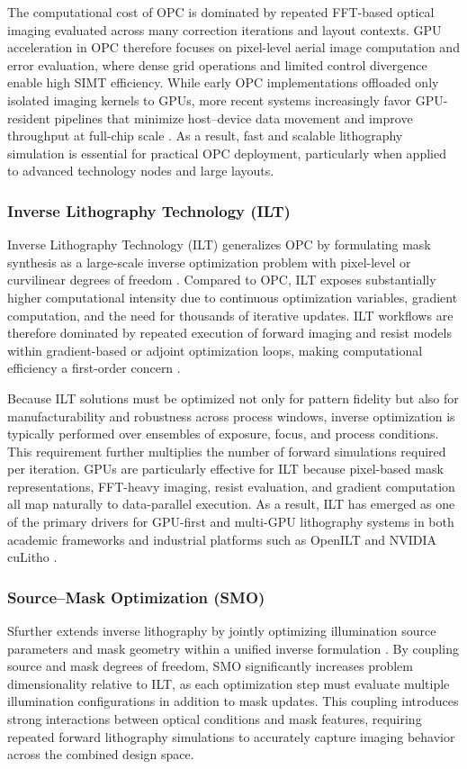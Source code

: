 \documentclass[pdflatex,sn-mathphys-num]{sn-jnl}%
\theoremstyle{thmstyleone}%
\theoremstyle{thmstyletwo}%
\theoremstyle{thmstylethree}%
\begin{document}
The computational cost of OPC is dominated by repeated FFT-based optical imaging evaluated across many correction iterations and layout contexts. GPU acceleration in OPC therefore focuses on pixel-level aerial image computation and error evaluation, where dense grid operations and limited control divergence enable high SIMT efficiency. While early OPC implementations offloaded only isolated imaging kernels to GPUs, more recent systems increasingly favor GPU-resident pipelines that minimize host–device data movement and improve throughput at full-chip scale \cite{Zheng2023}. As a result, fast and scalable lithography simulation is essential for practical OPC deployment, particularly when applied to advanced technology nodes and large layouts.

\subsubsection{Inverse Lithography Technology (ILT)}
Inverse Lithography Technology (ILT) generalizes OPC by formulating mask synthesis as a large-scale inverse optimization problem with pixel-level or curvilinear degrees of freedom \cite{Gallatin2005}. Compared to OPC, ILT exposes substantially higher computational intensity due to continuous optimization variables, gradient computation, and the need for thousands of iterative updates. ILT workflows are therefore dominated by repeated execution of forward imaging and resist models within gradient-based or adjoint optimization loops, making computational efficiency a first-order concern \cite{Gallatin2005,smith2003methods}.

Because ILT solutions must be optimized not only for pattern fidelity but also for manufacturability and robustness across process windows, inverse optimization is typically performed over ensembles of exposure, focus, and process conditions. This requirement further multiplies the number of forward simulations required per iteration. GPUs are particularly effective for ILT because pixel-based mask representations, FFT-heavy imaging, resist evaluation, and gradient computation all map naturally to data-parallel execution. As a result, ILT has emerged as one of the primary drivers for GPU-first and multi-GPU lithography systems in both academic frameworks and industrial platforms such as OpenILT and NVIDIA cuLitho \cite{torunoglu2010gpu,Singh}.


\subsubsection{Source–Mask Optimization (SMO)}
Sfurther extends inverse lithography by jointly optimizing illumination source parameters and mask geometry within a unified inverse formulation \cite{Socha66}. By coupling source and mask degrees of freedom, SMO significantly increases problem dimensionality relative to ILT, as each optimization step must evaluate multiple illumination configurations in addition to mask updates. This coupling introduces strong interactions between optical conditions and mask features, requiring repeated forward lithography simulations to accurately capture imaging behavior across the combined design space.
\end{document}

